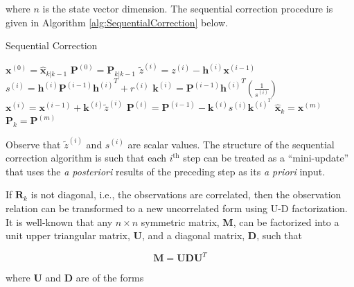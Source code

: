 where $n$ is the state vector dimension. The sequential correction procedure is given in
Algorithm \ref{alg:SequentialCorrection} below.

\begin{algorithm}
    \caption{Sequential Correction}
    \label{alg:SequentialCorrection}
    \begin{algorithmic}
        \STATE $\mathbf{x}^{(0)} = \hat{\mathbf{x}}_{k|k-1}$
        \STATE $\mathbf{P}^{(0)} = \mathbf{P}_{k|k-1}$
            \STATE $\tilde{z}^{(i)} = z^{(i)} - \mathbf{h}^{(i)} \mathbf{x}^{(i-1)}$
            \STATE $s^{(i)} = \mathbf{h}^{(i)} \mathbf{P}^{(i-1)} {\mathbf{h}^{(i)}}^T + r^{(i)}$
            \STATE $\mathbf{k}^{(i)} = \mathbf{P}^{(i-1)} {\mathbf{h}^{(i)}}^T \left( \frac { 1 } { s^{(i)} } \right)$
            \STATE $\mathbf{x}^{(i)} = \mathbf{x}^{(i-1)} + \mathbf{k}^{(i)} \tilde{z}^{(i)}$
            \STATE $\mathbf{P}^{(i)}  = \mathbf{P}^{(i-1)} - \mathbf{k}^{(i)} s^{(i)} \mathbf{k}^{(i)^T}$
        \ENDFOR
        \STATE $\hat{\mathbf{x}}_{k} = \mathbf{x}^{(m)}$
        \STATE $\mathbf{P}_{k} = \mathbf{P}^{(m)}$
    \end{algorithmic}
\end{algorithm}

Observe that $\tilde{z}^{(i)}$ and $s^{(i)}$ are scalar values.
The structure of the sequential correction algorithm is such that each $i^{\text{th}}$ step
can be treated as a “mini-update” that uses the \textit{a posteriori} results of the
preceding step as its \textit{a priori} input.

If $\mathbf{R}_k$ is not diagonal, i.e., the observations are correlated, then the
observation relation can be transformed to a new uncorrelated form using U-D factorization.
It is well-known that any $n \times n$ symmetric matrix, $\mathbf{M}$, can be factorized
into a unit upper triangular matrix, $\mathbf{U}$, and a diagonal matrix, $\mathbf{D}$,
such that

\begin{equation*}
    \mathbf{M} = \mathbf{U} \mathbf{D} \mathbf{U}^T
\end{equation*}

where $\mathbf{U}$ and $\mathbf{D}$ are of the forms

